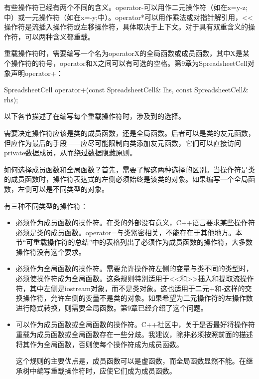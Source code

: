 有些操作符已经有两个不同的含义。operator-可以用作二元操作符（如在x=y-z;中）或一元操作符（如在x=-y;中）。operator*可以用作乘法或对指针解引用，<{}<操作符是流插入操作符或左移操作符，具体取决于上下文。对于具有双重含义的操作符，可以两种含义都重载。


重载操作符时，需要编写一个名为operatorX的全局函数或成员函数，其中X是某个操作符的符号，operator和X之间可以有可选的空格。第9章为SpreadsheetCell对象声明operator+：

\begin{cpp}
SpreadsheetCell operator+(const SpreadsheetCell& lhs, const SpreadsheetCell& rhs);
\end{cpp}

以下各节描述了在编写每个重载操作符时，涉及到的选择。


需要决定操作符应该是类的成员函数，还是全局函数。后者可以是类的友元函数，但应作为最后的手段——应尽可能限制向类添加友元函数，它们可以直接访问private数据成员，从而绕过数据隐藏原则。

如何选择成员函数和全局函数？首先，需要了解这两种选择的区别。当操作符是类的成员函数时，操作符表达式的左侧必须始终是该类的对象。如果编写一个全局函数，左侧可以是不同类型的对象。

有三种不同类型的操作符：

\begin{itemize}
\item
必须作为成员函数的操作符。在类的外部没有意义，C++语言要求某些操作符必须是类的成员函数。operator=与类紧密相关，不能存在于其他地方。本节“可重载操作符的总结”中的表格列出了必须作为成员函数的操作符，大多数操作符没有这个要求。

\item
必须作为全局函数的操作符。需要允许操作符左侧的变量与类不同的类型时，必须使操作符成为全局函数。这条规则特别适用于<{}<和>{>}插入和提取流操作符，其中左侧是iostream对象，而不是类对象。这也适用于二元+和-这样的交换操作符，允许左侧的变量不是类的对象。如果希望为二元操作符的左操作数进行隐式转换，则需要全局函数。第9章已经介绍了这个问题。

\item
可以作为成员函数或全局函数的操作符。C++社区中，关于是否最好将操作符重载为成员函数或全局函数存在一些分歧。我建议，除非必须按照前面的描述将其作为全局函数，否则使每个操作符成为成员函数。

这个规则的主要优点是，成员函数可以是虚函数，而全局函数显然不能。在继承树中编写重载操作符时，应使它们成为成员函数。
\end{itemize}

